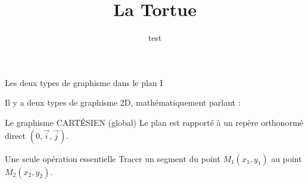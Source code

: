\documentclass[10pt]{beamer}
\title{La Tortue}
\begin{document}
\maketitle

\begin{frame}{Les deux types de graphisme dans le plan I}
\subtitle{test}
  Il y a deux types de graphisme 2D, mathématiquement parlant :
  \begin{alertblock}{Le graphisme CARTÉSIEN (global)}
    Le plan est rapporté à un repère orthonormé direct $(0,\vec{i},\vec{j})$.
  \end{alertblock}

  \begin{block}{Une seule opération essentielle}
    \alert{Tracer un segment} du point $M_1 (x_1,y_1)$ au point $M_2 (x_2, y_2)$.
  \end{block}
  \begin{center}
  \end{center}
\end{frame}
\end{document}
